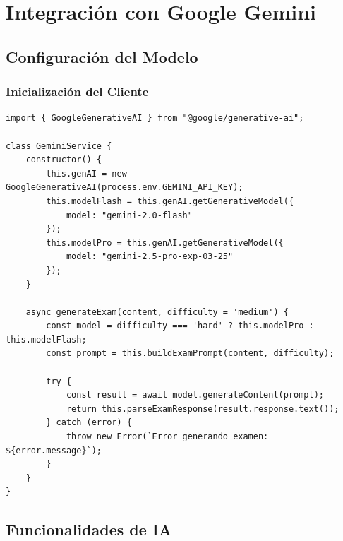 \documentclass[12pt,a4paper]{report}
\begin{document}
\section{Integración con Google Gemini}

\subsection{Configuración del Modelo}

\subsubsection{Inicialización del Cliente}
\begin{lstlisting}
import { GoogleGenerativeAI } from "@google/generative-ai";

class GeminiService {
    constructor() {
        this.genAI = new GoogleGenerativeAI(process.env.GEMINI_API_KEY);
        this.modelFlash = this.genAI.getGenerativeModel({
            model: "gemini-2.0-flash"
        });
        this.modelPro = this.genAI.getGenerativeModel({
            model: "gemini-2.5-pro-exp-03-25"
        });
    }
    
    async generateExam(content, difficulty = 'medium') {
        const model = difficulty === 'hard' ? this.modelPro : this.modelFlash;
        const prompt = this.buildExamPrompt(content, difficulty);
        
        try {
            const result = await model.generateContent(prompt);
            return this.parseExamResponse(result.response.text());
        } catch (error) {
            throw new Error(`Error generando examen: ${error.message}`);
        }
    }
}
\end{lstlisting}

\subsection{Funcionalidades de IA}
\end{document}
